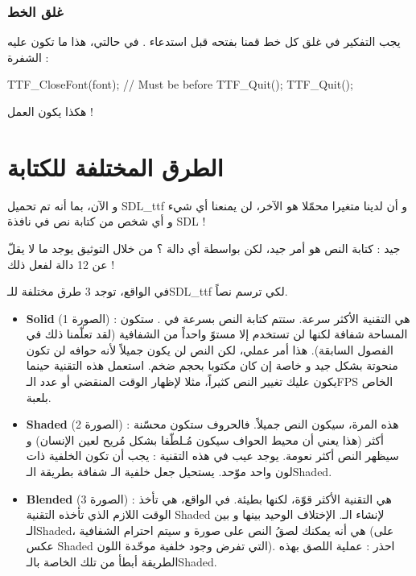 \subsubsection{غلق الخط}

يجب التفكير في غلق كل خط قمنا بفتحه قبل استدعاء
.
في حالتي، هذا ما تكون عليه الشفرة :

\begin{Csource}
TTF_CloseFont(font); // Must be before TTF_Quit();
TTF_Quit();
\end{Csource}

هكذا يكون العمل !

\section{الطرق المختلفة للكتابة}

و الآن، بما أنه تم تحميل
\textenglish{SDL\_ttf}
و أن لدينا متغيرا 
محمّلا هو الآخر، لن يمنعنا أي شيء و أي شخص من كتابة نص في نافذة 
\textenglish{SDL} !

جيد : كتابة النص هو أمر جيد، لكن بواسطة أي دالة ؟ من خلال التوثيق يوجد ما لا يقلّ عن 12 دالة لفعل ذلك !

في الواقع، توجد 3 طرق مختلفة للـ\textenglish{SDL\_ttf}
لكي ترسم نصاً.


\begin{itemize}
	\item \textbf{\textenglish{Solid}}
	(الصورة 1) : هي التقنية الأكثر سرعة. ستتم كتابة النص بسرعة في
	.
	ستكون المساحة شفافة لكنها لن تستخدم إلا مستوً واحداً من الشفافية (لقد تعلّمنا ذلك في الفصول السابقة). هذا أمر عملي، لكن النص لن يكون جميلاً لأنه حوافه لن تكون منحوتة بشكل جيد و خاصة إن كان مكتوبا بحجم ضخم. استعمل هذه التقنية حينما يكون عليك تغيير النص كثيراً، مثلا لإظهار الوقت المنقضي أو عدد الـ\textenglish{FPS}
	الخاص بلعبة.
	\item \textbf{\textenglish{Shaded}}
	(الصورة 2) : هذه المرة، سيكون النص جميلاً. فالحروف ستكون محسّنة أكثر (هذا يعني أن محيط الحواف سيكون مُـلطّفا بشكل مُريح لعين الإنسان) و سيظهر النص أكثر نعومة. يوجد عيب في هذه التقنية : يجب أن تكون الخلفية ذات لون واحد موّحد. يستحيل جعل خلفية الـ
	شفافة بطريقة الـ\textenglish{Shaded}.
	\item \textbf{\textenglish{Blended}}
	(الصورة 3) : هي التقنية الأكثر قوّة، لكنها بطيئة. في الواقع، هي تأخذ الوقت اللازم الذي تأخذه التقنية 
	\textenglish{Shaded}
	لإنشاء الـ.
	الإختلاف الوحيد بينها و بين الـ\textenglish{Shaded}،
	هي أنه يمكنك لصقُ النص على صورة و سيتم احترام الشفافية (على عكس
	\textenglish{Shaded}
	التي تفرض وجود خلفية موحّدة اللون). احذر : عملية اللصق بهذه الطريقة أبطأ من تلك الخاصة بالـ\textenglish{Shaded}.
\end{itemize}

